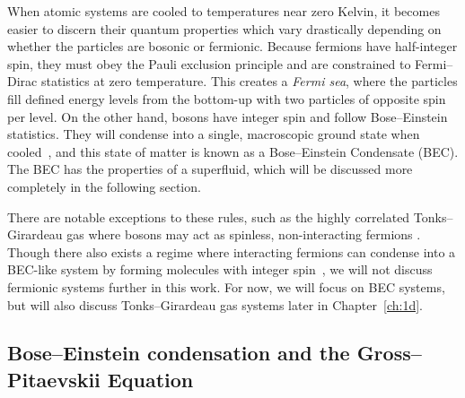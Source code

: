 When atomic systems are cooled to temperatures near zero Kelvin, it becomes easier to discern their quantum properties which vary drastically depending on whether the particles are bosonic or fermionic.
Because fermions have half-integer spin, they must obey the Pauli exclusion principle and are constrained to Fermi--Dirac statistics at zero temperature.
This creates a \textit{Fermi sea}, where the particles fill defined energy levels from the bottom-up with two particles of opposite spin per level.
On the other hand, bosons have integer spin and follow Bose--Einstein statistics.
They will condense into a single, macroscopic ground state when cooled~\cite{einstein1925, fetter2003}, and
this state of matter is known as a Bose--Einstein Condensate (BEC).
The BEC has the properties of a superfluid, which will be discussed more completely in the following section.

There are notable exceptions to these rules, such as the highly correlated Tonks--Girardeau gas where bosons may act as spinless, non-interacting fermions \cite{girardeau1960, schloss2016}.
Though there also exists a regime where interacting fermions can condense into a BEC-like system by forming molecules with integer spin~\cite{nozieres1985, bulgac2014}, we will not discuss fermionic systems further in this work.
For now, we will focus on BEC systems, but will also discuss Tonks--Girardeau gas systems later in Chapter~\ref{ch:1d}.

\subsection{Bose--Einstein condensation and the Gross--Pitaevskii Equation}


